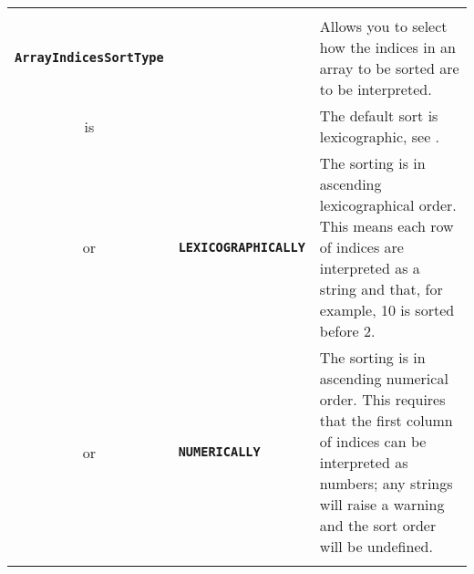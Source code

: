 \documentclass{article}
\def\ttref#1{\ahrefloc{#1}{\tt #1}}
\def\DEFINE#1{{\tt \bf #1}\label{#1}\index{#1}}
\begin{document}
\begin{tabular}{cp{10in}|p{10in}}
\\

\\

\DEFINE{ArrayIndicesSortType} && Allows you to select how the indices
in an array to be sorted are to be interpreted. \\

is && The default sort is lexicographic, see \ttref{LEXICOGRAPHICALLY}.\\

or & \DEFINE{LEXICOGRAPHICALLY} & The sorting is in ascending
lexicographical order. This means each row of indices are interpreted
as a string and that, for example, 10 is sorted before 2.\\

or & \DEFINE{NUMERICALLY} & The sorting is in ascending numerical
order. This requires that the first column of indices can be
interpreted as numbers; any strings will raise a warning and the sort
order will be undefined. \\

\\


\end{tabular}
\end{document}
